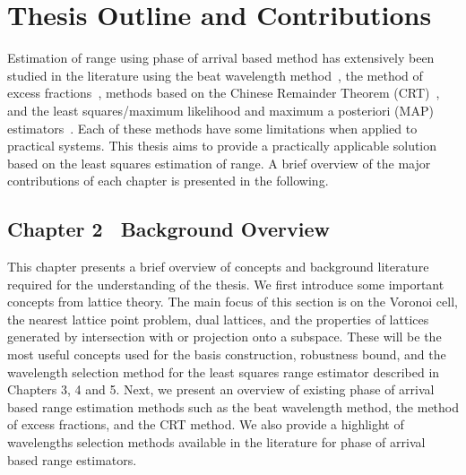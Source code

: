 \section{Thesis Outline and Contributions}
Estimation of range using phase of arrival based method has extensively been studied in the literature using the beat wavelength method~\cite{Towers_frequency_selection_interferometry_2003,Towers:04_generalised_frequency_selection}, the method of excess fractions~\cite{Falaggis_excess_fractions_2011,Falaggis_excess_fractions_2012,Falaggis_excess_fractions_2013,Falaggis_algebraic_solution_2014}, methods based on the Chinese Remainder Theorem (CRT)~\cite{Oystein_Ore_general_chinese_Remainder_1952, Oded_Chinese_remaindering_with_errors_2000, Xia_generalised_CRT_2005, Xia2007, XWLi2008, W.Wang_closed_form_crt_2010, YangBin_range_estimation_with_CRT_2014, Xiao_multistage_crt_2014}, and the least squares/maximum likelihood and maximum a posteriori (MAP) estimators~\cite{Teunissen_GPS_1995, Hassibi_GPS_1998, Li_distance_est_wrapped_phase}. Each of these methods have some limitations when applied to practical systems. This thesis aims to provide a practically applicable solution based on the least squares estimation of range. A brief overview of the major contributions of each chapter is presented in the following.

\subsection*{Chapter 2 \textemdash~Background Overview}
This chapter presents a brief overview of concepts and background literature required for the understanding of the thesis. We first introduce some important concepts from lattice theory. The main focus of this section is on the Voronoi cell, the nearest lattice point problem, dual lattices, and the properties of lattices generated by intersection with or projection onto a subspace. These will be the most useful concepts used for the basis construction, robustness bound, and the wavelength selection method for the least squares range estimator described in Chapters 3, 4 and 5. %
Next, we present an overview of existing phase of arrival based range estimation methods such as the beat wavelength method, the method of excess fractions, and the CRT method. We also provide a highlight of wavelengths selection methods available in the literature for phase of arrival based range estimators. 

